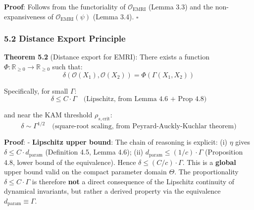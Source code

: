 \documentclass[
]{article}
\begin{document}
\textbf{Proof}: Follows from the functoriality of
\(\mathcal{O}_{\text{EMRI}}\) (Lemma 3.3) and the non-expansiveness of
\(\mathcal{O}_{\text{EMRI}}(\psi)\) (Lemma 3.4). \(\square\)

\subsubsection{5.2 Distance Export
Principle}\label{distance-export-principle}

\textbf{Theorem 5.2} (Distance export for EMRI): There exists a function
\(\Phi: \mathbb{R}_{\geq 0} \to \mathbb{R}_{\geq 0}\) such that:
\[\delta(\mathcal{O}(X_1), \mathcal{O}(X_2)) = \Phi(\Gamma(X_1, X_2))\]

Specifically, for small \(\Gamma\):
\[\delta \leq C \cdot \Gamma \quad \text{(Lipschitz, from Lemma 4.6 + Prop 4.8)}\]

and near the KAM threshold \(\rho_{s,\text{crit}}\):
\[\delta \sim \Gamma^{1/2} \quad \text{(square-root scaling, from Peyrard-Auckly-Kuchlar theorem)}\]

\textbf{Proof}: - \textbf{Lipschitz upper bound}: The chain of reasoning
is explicit: (i) \(\eta\) gives \(\delta \leq C \cdot d_{\text{param}}\)
(Definition 4.5, Lemma 4.6); (ii)
\(d_{\text{param}} \leq (1/c) \cdot \Gamma\) (Proposition 4.8, lower
bound of the equivalence). Hence \(\delta \leq (C/c) \cdot \Gamma\).
This is a \textbf{global} upper bound valid on the compact parameter
domain \(\Theta\). The proportionality \(\delta \leq C \cdot \Gamma\) is
therefore \textbf{not} a direct consequence of the Lipschitz continuity
of dynamical invariants, but rather a derived property via the
equivalence \(d_{\text{param}} \equiv \Gamma\).
\end{document}
